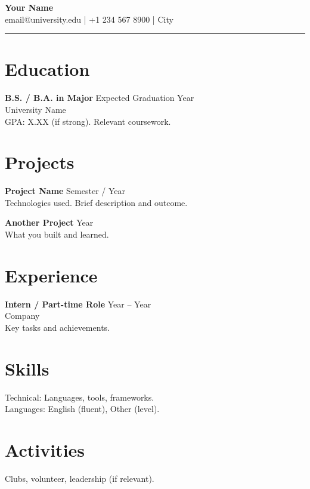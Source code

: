 \documentclass[11pt,a4paper]{article}
\begin{document}
\begin{center}
{\LARGE \textbf{Your Name}}\\[0.2em]
email@university.edu \quad | \quad +1 234 567 8900 \quad | \quad City
\end{center}
\begin{flushright}\rule{2cm}{2.5cm}\end{flushright}
\vspace{0.4em}
\section*{Education}
\textbf{B.S. / B.A. in Major} \hfill Expected Graduation Year \\
University Name \\
GPA: X.XX (if strong). Relevant coursework.

\section*{Projects}
\textbf{Project Name} \hfill Semester / Year \\
Technologies used. Brief description and outcome.

\textbf{Another Project} \hfill Year \\
What you built and learned.

\section*{Experience}
\textbf{Intern / Part-time Role} \hfill Year -- Year \\
Company \\
Key tasks and achievements.

\section*{Skills}
Technical: Languages, tools, frameworks. \\
Languages: English (fluent), Other (level).

\section*{Activities}
Clubs, volunteer, leadership (if relevant).
\end{document}
